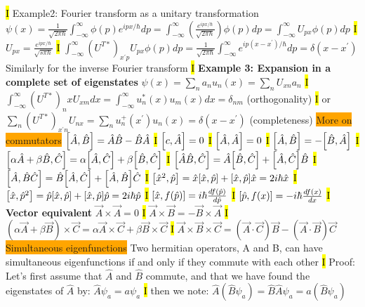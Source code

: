 \documentclass[fontsize=4pt]{scrartcl}
\begin{document}
\hl{I}
Example2: Fourier transform as a unitary transformation 
$\psi (x) = \frac{1}{\sqrt{2\pi \hbar}} \int_{-\infty}^{\infty} \phi(p)e^{ipx/\hbar}dp =  \int_{-\infty}^{\infty} (\frac{e^{ipx/\hbar}}{\sqrt{2\pi \hbar}}) \phi(p)dp = \int_{-\infty}^{\infty} U_{px} \phi(p)dp$
\hl{I}
$U_{px} = \frac{e^{ipx/\hbar}}{\sqrt{s \pi \hbar}}$
\hl{I}
$\int_{-\infty}^{\infty} (U^{T*})_{x^{\prime}p} U_{px}  \phi(p)dp =  \frac{1}{\sqrt{2\pi \hbar}} \int_{-\infty}^{\infty} e^{ip(x-x^{\prime})/\hbar} dp = \delta(x-x^{\prime}) $ Similarly for the inverse Fourier transform
\hl{I}
\textbf{Example 3: Expansion in a complete set of eigenstates} 
$\psi(x) = \sum_{n} a_n u_n (x) = \sum_n U_{xn} a_n$
\hl{I}
$\int_{-\infty}^{\infty} (U^{T*})_nx U_{xm} dx = \int_{-\infty}^{\infty}  u_{n}^{*}(x)u_{m}(x)dx = \delta_{nm}$ (orthogonality)
\hl{I}
or $\sum_{n}(U^{T*})_{x^{\prime}n}U_{nx} = \sum_{n}u_{n}^{+}(x^{\prime})u_{n}(x) = \delta(x-x^{\prime})$ (completeness)
\colorbox{Orange}{More on commutators}
$\comm{\hat{A}}{\hat{B}} = \hat{A}\hat{B} - \hat{B}\hat{A}$
\hl{I}
$\comm{c}{\hat{A}} = 0$
\hl{I}
$\comm{\hat{A}}{\hat{A}} = 0$
\hl{I}
$\comm{\hat{A}}{\hat{B}} = - \comm{\hat{B}}{\hat{A}}$
\hl{I}
$\comm{\alpha \hat{A} + \beta \hat{B}}{\hat{C}} = \alpha \comm{\hat{A}}{\hat{C}} + \beta \comm{\hat{B}}{\hat{C}}$
\hl{I}
$\comm{\hat{A}\hat{B}}{\hat{C}} = \hat{A}\comm{\hat{B}}{\hat{C}} + \comm{\hat{A}}{\hat{C}}\hat{B} $
\hl{I}
$\comm{\hat{A}}{\hat{B}\hat{C}} = \hat{B}\comm{\hat{A}}{\hat{C}} + \comm{\hat{A}}{\hat{B}}\hat{C} $
\hl{I}
$\comm{\hat{x}^{2}}{\hat{p}} = \hat{x}\comm{\hat{x}}{\hat{p}} + \comm{\hat{x}}{\hat{p}}\hat{x} = 2i \hbar \hat{x}$
\hl{I}
$\comm{\hat{x}}{\hat{p}^{2}} = \hat{p}\comm{\hat{x}}{\hat{p}} + \comm{\hat{x}}{\hat{p}}\hat{p} = 2i \hbar \hat{p} $
\hl{I}
$\comm{\hat{x}}{f(\hat{p})} = i\hbar \frac{df(\hat{p})}{d\hat{p}}$
\hl{I}
$\comm{\hat{p}}{f(x)} = -i\hbar \frac{df(x)}{dx}$
\hl{I}
\textbf{Vector equivalent}
$\vec{A} \times \vec{A} = 0$
\hl{I}
$\vec{A} \times \vec{B} = -\vec{B} \times \vec{A}$
\hl{I}
$(\alpha \vec{A} + \beta \vec{B})\times \vec{C} = \alpha \vec{A} \times \vec{C} + \beta \vec{B} \times \vec{C}$
\hl{I}
$\vec{A} \times \vec{B} \times \vec{C} = (\vec{A} \cdot \vec{C})\vec{B} - (\vec{A} \cdot \vec{B})\vec{C}$
\colorbox{Orange}{Simultaneous eigenfunctions}
Two hermitian operators, A and B, can have simultaneous eigenfunctions if and only if they commute with each other 
\hl{I}
Proof: Let's first assume that $\hat{A}$ and $\hat{B}$ commute, and that we have found the eigenstates of $\hat{A}$ by: $\hat{A} \psi_a = a \psi_a$
\hl{I}
then we note: $\hat{A}(\hat{B} \psi_a) = \hat{B}\hat{A}\psi_a = a(\hat{B} \psi_a)$
\end{document}
